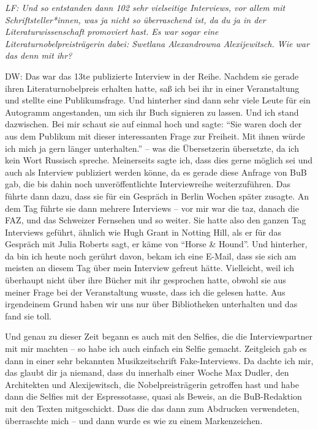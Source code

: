 \documentclass[a4paper,
fontsize=11pt,
oneside,
numbers=noperiodatend,
parskip=half-,
bibliography=totoc,
final
]{scrartcl}
\begin{document}
\emph{LF: Und so entstanden dann 102 sehr vielseitige Interviews, vor
allem mit Schriftsteller*innen, was ja nicht so überraschend ist, da du
ja in der Literaturwissenschaft promoviert hast. Es war sogar eine
Literaturnobelpreisträgerin dabei: Swetlana Alexandrowna Alexijewitsch.
Wie war das denn mit ihr?}

DW: Das war das 13te publizierte Interview in der Reihe. Nachdem sie
gerade ihren Literaturnobelpreis erhalten hatte, saß ich bei ihr in
einer Veranstaltung und stellte eine Publikumsfrage. Und hinterher sind
dann sehr viele Leute für ein Autogramm angestanden, um sich ihr Buch
signieren zu lassen. Und ich stand dazwischen. Bei mir schaut sie auf
einmal hoch und sagte: \enquote{Sie waren doch der aus dem Publikum mit
dieser interessanten Frage zur Freiheit. Mit ihnen würde ich mich ja
gern länger unterhalten.} -- was die Übersetzerin übersetzte, da ich
kein Wort Russisch spreche. Meinerseits sagte ich, dass dies gerne
möglich sei und auch als Interview publiziert werden könne, da es gerade
diese Anfrage von BuB gab, die bis dahin noch unveröffentlichte
Interviewreihe weiterzuführen. Das führte dann dazu, dass sie für ein
Gespräch in Berlin Wochen später zusagte. An dem Tag führte sie dann
mehrere Interviews -- vor mir war die taz, danach die FAZ, und das
Schweizer Fernsehen und so weiter. Sie hatte also den ganzen Tag
Interviews geführt, ähnlich wie Hugh Grant in Notting Hill, als er für
das Gespräch mit Julia Roberts sagt, er käme von \enquote{Horse \&
Hound}. Und hinterher, da bin ich heute noch gerührt davon, bekam ich
eine E-Mail, dass sie sich am meisten an diesem Tag über mein Interview
gefreut hätte. Vielleicht, weil ich überhaupt nicht über ihre Bücher mit
ihr gesprochen hatte, obwohl sie aus meiner Frage bei der Veranstaltung
wusste, dass ich die gelesen hatte. Aus irgendeinem Grund haben wir uns
nur über Bibliotheken unterhalten und das fand sie toll.

Und genau zu dieser Zeit begann es auch mit den Selfies, die die
Interviewpartner mit mir machten -- so habe ich auch einfach ein Selfie
gemacht. Zeitgleich gab es dann in einer sehr bekannten Musikzeitschrift
Fake-Interviews. Da dachte ich mir, das glaubt dir ja niemand, dass du
innerhalb einer Woche Max Dudler, den Architekten und Alexijewitsch, die
Nobelpreisträgerin getroffen hast und habe dann die Selfies mit der
Espressotasse, quasi als Beweis, an die BuB-Redaktion mit den Texten
mitgeschickt. Dass die das dann zum Abdrucken verwendeten, überraschte
mich -- und dann wurde es wie zu einem Markenzeichen.
\end{document}

